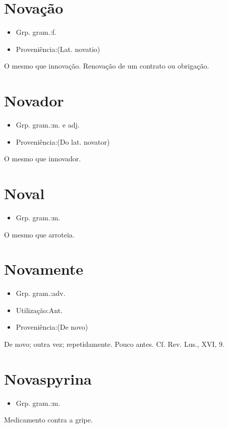\section{Novação}
\begin{itemize}
\item {Grp. gram.:f.}
\end{itemize}
\begin{itemize}
\item {Proveniência:(Lat. \textunderscore novatio\textunderscore )}
\end{itemize}
O mesmo que \textunderscore innovação\textunderscore .
Renovação de um contrato ou obrigação.
\section{Novador}
\begin{itemize}
\item {Grp. gram.:m.  e  adj.}
\end{itemize}
\begin{itemize}
\item {Proveniência:(Do lat. \textunderscore novator\textunderscore )}
\end{itemize}
O mesmo que \textunderscore innovador\textunderscore .
\section{Noval}
\begin{itemize}
\item {Grp. gram.:m.}
\end{itemize}
O mesmo que \textunderscore arroteia\textunderscore .
\section{Novamente}
\begin{itemize}
\item {Grp. gram.:adv.}
\end{itemize}
\begin{itemize}
\item {Utilização:Ant.}
\end{itemize}
\begin{itemize}
\item {Proveniência:(De \textunderscore novo\textunderscore )}
\end{itemize}
De novo; outra vez; repetidamente.
Pouco antes. Cf. \textunderscore Rev. Lus.\textunderscore , XVI, 9.
\section{Novaspyrina}
\begin{itemize}
\item {Grp. gram.:m.}
\end{itemize}
Medicamento contra a gripe.
